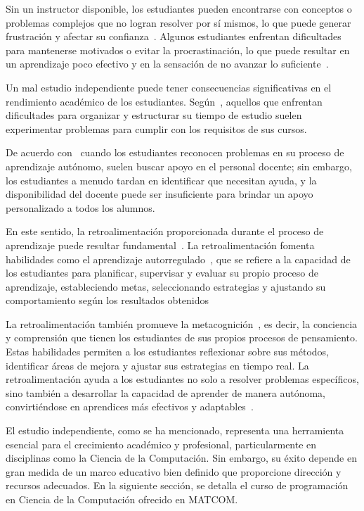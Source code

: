\documentclass{article}
\begin{document}
Sin un instructor disponible, los estudiantes pueden encontrarse con conceptos o problemas complejos que no logran resolver por sí mismos, lo que puede generar frustración y afectar su confianza~\cite{overklift2019}. Algunos estudiantes enfrentan dificultades para mantenerse motivados o evitar la procrastinación, lo que puede resultar en un aprendizaje poco efectivo y en la sensación de no avanzar lo suficiente~\cite{coto02012022}. 

Un mal estudio independiente puede tener consecuencias significativas en el rendimiento académico de los estudiantes. Según~\cite{overklift2019}, aquellos que enfrentan dificultades para organizar y estructurar su tiempo de estudio suelen experimentar problemas para cumplir con los requisitos de sus cursos.

De acuerdo con~\cite{overklift2019} cuando los estudiantes reconocen problemas en su proceso de aprendizaje autónomo, suelen buscar apoyo en el personal docente; sin embargo, los estudiantes a menudo tardan en identificar que necesitan ayuda, y la disponibilidad del docente puede ser insuficiente para brindar un apoyo personalizado a todos los alumnos.

En este sentido, la retroalimentación proporcionada durante el proceso de aprendizaje puede resultar fundamental~\cite{Sarsa_2022}. La retroalimentación fomenta habilidades como el aprendizaje autorregulado~\cite{Sarsa_2022}, que se refiere a la capacidad de los estudiantes para planificar, supervisar y evaluar su propio proceso de aprendizaje, estableciendo metas, seleccionando estrategias y ajustando su comportamiento según los resultados obtenidos

La retroalimentación también promueve la metacognición~\cite{Sarsa_2022}, es decir, la conciencia y comprensión que tienen los estudiantes de sus propios procesos de pensamiento. Estas habilidades permiten a los estudiantes reflexionar sobre sus métodos, identificar áreas de mejora y ajustar sus estrategias en tiempo real. La retroalimentación ayuda a los estudiantes no solo a resolver problemas específicos, sino también a desarrollar la capacidad de aprender de manera autónoma, convirtiéndose en aprendices más efectivos y adaptables~\cite{shute2008focus}.

El estudio independiente, como se ha mencionado, representa una herramienta esencial para el crecimiento académico y profesional, particularmente en disciplinas como la Ciencia de la Computación. Sin embargo, su éxito depende en gran medida de un marco educativo bien definido que proporcione dirección y recursos adecuados. En la siguiente sección, se detalla el curso de programación en Ciencia de la Computación ofrecido en \mbox{MATCOM}.
\end{document}
